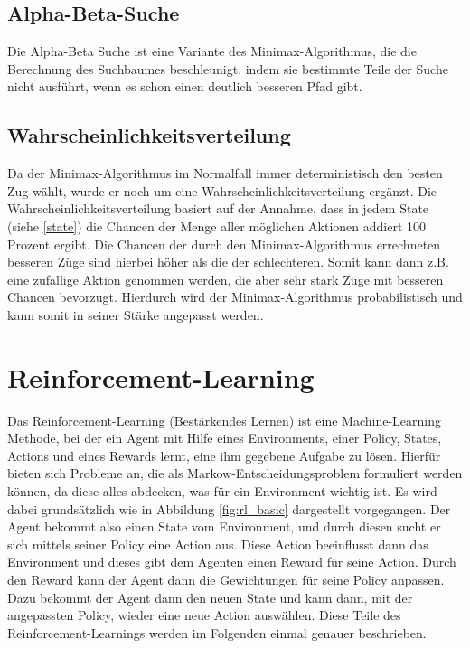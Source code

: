\subsection{Alpha-Beta-Suche}
Die Alpha-Beta Suche ist eine Variante des Minimax-Algorithmus, die die Berechnung des Suchbaumes beschleunigt, indem sie bestimmte Teile der Suche nicht ausführt, wenn es schon einen deutlich besseren Pfad gibt.\cite{abdelbar2012alpha}
\newpage

\subsection{Wahrscheinlichkeitsverteilung}
Da der Minimax-Algorithmus im Normalfall immer deterministisch den besten Zug wählt, wurde er noch um eine Wahrscheinlichkeitsverteilung ergänzt. 
Die Wahrscheinlichkeitsverteilung basiert auf der Annahme, dass in jedem State (siehe \ref{state}) die Chancen der Menge aller möglichen Aktionen addiert 100 Prozent ergibt. Die Chancen der durch den Minimax-Algorithmus errechneten besseren Züge sind hierbei höher als die der schlechteren. Somit kann dann z.B. eine zufällige Aktion genommen werden, die aber sehr stark Züge mit besseren Chancen bevorzugt. Hierdurch wird der Minimax-Algorithmus probabilistisch und kann somit in seiner Stärke angepasst werden.\cite{diederich2003simple}

\section{Reinforcement-Learning}
Das Reinforcement-Learning (Bestärkendes Lernen) ist eine Machine-Learning Methode, bei der ein Agent mit Hilfe eines Environments, einer Policy, States, Actions und eines Rewards lernt, eine ihm gegebene Aufgabe zu lösen. Hierfür bieten sich Probleme an, die als Markow-Entscheidungsproblem formuliert werden können, da diese alles abdecken, was für ein Environment wichtig ist.\cite{Martijn2012} Es wird dabei grundsätzlich wie in Abbildung \ref{fig:rl_basic} dargestellt vorgegangen. Der Agent bekommt also einen State vom Environment, und durch diesen sucht  er sich mittels seiner Policy eine Action aus. Diese Action beeinflusst dann das Environment und dieses gibt dem Agenten einen Reward für seine Action. Durch den Reward kann der Agent dann die Gewichtungen für seine Policy anpassen. Dazu bekommt der Agent dann den neuen State und kann dann, mit der angepassten Policy, wieder eine neue Action auswählen. Diese Teile des Reinforcement-Learnings werden im Folgenden einmal genauer beschrieben.\cite{HandsOn2017, Sutton2018}\\

